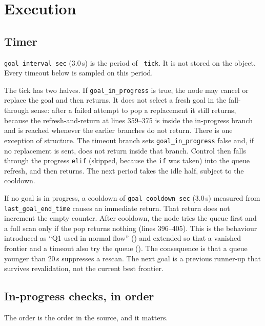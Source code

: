 \documentclass[11pt]{article}
\begin{document}
\section{Execution}
\label{sec:tick}
\subsection{Timer}
\texttt{goal\_interval\_sec} ($3.0$\,s) is the period of \texttt{\_tick}. It is not stored on the object. Every timeout below is sampled on this period.

The tick has two halves. If \texttt{goal\_in\_progress} is true, the node may cancel or replace the goal and then returns. It does not select a fresh goal in the fall-through sense: after a failed attempt to pop a replacement it still returns, because the refresh-and-return at lines 359--375 is inside the in-progress branch and is reached whenever the earlier branches do not return. There is one exception of structure. The timeout branch sets \texttt{goal\_in\_progress} false and, if no replacement is sent, does not return inside that branch. Control then falls through the progress \texttt{elif} (skipped, because the \texttt{if} was taken) into the queue refresh, and then returns. The next period takes the idle half, subject to the cooldown.

If no goal is in progress, a cooldown of \texttt{goal\_cooldown\_sec} ($3.0$\,s) measured from \texttt{last\_goal\_end\_time} causes an immediate return. That return does not increment the empty counter. After cooldown, the node tries the queue first and a full scan only if the pop returns nothing (lines 396--405). This is the behaviour introduced as ``Q1 used in normal flow'' () and extended so that a vanished frontier and a timeout also try the queue (). The consequence is that a queue younger than $20$\,s suppresses a rescan. The next goal is a previous runner-up that survives revalidation, not the current best frontier.

\subsection{In-progress checks, in order}
The order is the order in the source, and it matters.
\end{document}

